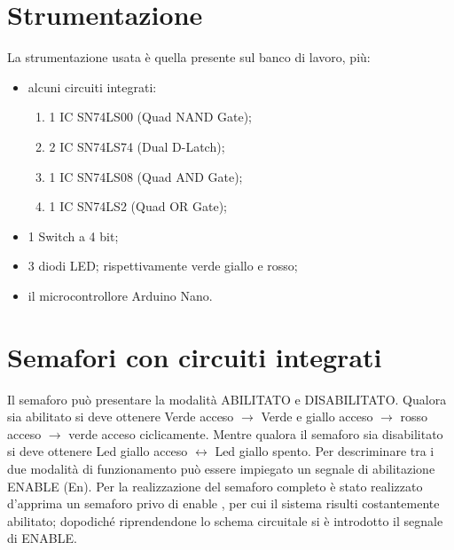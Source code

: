 \section{Strumentazione}
La strumentazione usata è quella presente sul banco di lavoro, più:
	\begin{itemize}
		\item alcuni circuiti integrati:
		\begin{enumerate}
			\item 1 IC SN74LS00 (Quad NAND Gate);
			\item 2 IC SN74LS74 (Dual D-Latch);
			\item 1 IC SN74LS08 (Quad AND Gate);
			\item 1 IC SN74LS2 (Quad OR Gate);
		\end{enumerate}
		\item 1 Switch a 4 bit;
		\item 3 diodi LED; rispettivamente verde giallo e rosso;
		\item il microcontrollore Arduino Nano.
	\end{itemize}
\section{Semafori con circuiti integrati }
Il semaforo può presentare la modalità ABILITATO e DISABILITATO. Qualora sia abilitato si deve 
ottenere Verde acceso $\longrightarrow$ Verde e 
giallo acceso $\longrightarrow$ rosso acceso $\longrightarrow$ 
verde acceso  ciclicamente. Mentre qualora il semaforo sia disabilitato si deve ottenere
Led giallo acceso $\leftrightarrow$ Led giallo spento.
Per descriminare tra i due modalità di funzionamento può essere impiegato un segnale di abilitazione 
ENABLE (En).
Per la realizzazione del semaforo completo è stato realizzato d'apprima un semaforo privo di enable , per cui il sistema risulti costantemente abilitato;
dopodiché riprendendone lo schema circuitale si è introdotto il segnale di ENABLE.